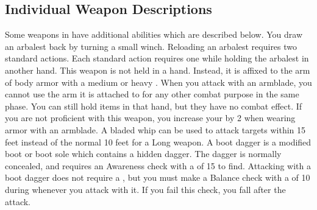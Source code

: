   \subsection{Individual Weapon Descriptions}
    Some weapons in  have additional abilities which are described below.
     You draw an arbalest back by turning a small winch. Reloading an arbalest requires two standard actions.
    Each standard action requires one  while holding the arbalest in another hand.
     This weapon is not held in a hand.
    Instead, it is affixed to the arm of body armor with a medium or heavy .
    When you attack with an armblade, you cannot use the arm it is attached to for any other combat purpose in the same phase.
    You can still hold items in that hand, but they have no combat effect.
    If you are not proficient with this weapon, you increase your  by 2 when wearing armor with an armblade.
     A bladed whip can be used to attack targets within 15 feet instead of the normal 10 feet for a Long weapon.
     A boot dagger is a modified boot or boot sole which contains a hidden dagger.
    The dagger is normally concealed, and requires an Awareness check with a  of 15 to find.
    Attacking with a boot dagger does not require a , but you must make a Balance check with a  of 10 during whenever you attack with it.
    If you fail this check, you fall \prone after the attack.

